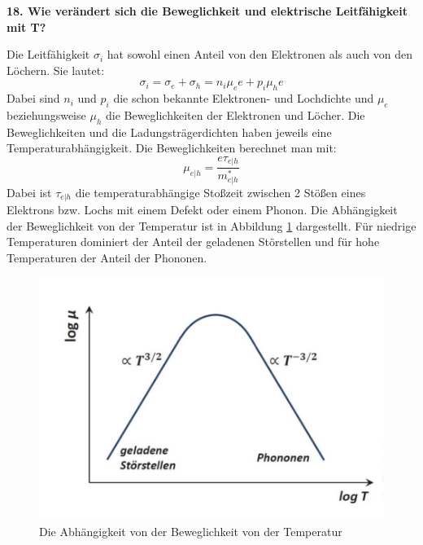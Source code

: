 \noindent\textbf{18. Wie verändert sich die Beweglichkeit und elektrische Leitfähigkeit mit T?}\\
\begin{addmargin}[25pt]{0pt}
Die Leitfähigkeit $\sigma_i$ hat sowohl einen Anteil von den Elektronen als auch von den Löchern. Sie lautet:
\begin{equation}\label{eq:leitfähigkeit}
    \sigma_i = \sigma_e + \sigma_h = n_i\mu_e e + p_i\mu_h e
\end{equation}
Dabei sind $n_i$ und $p_i$ die schon bekannte Elektronen- und Lochdichte und $\mu_e$ beziehungsweise $\mu_h$ die Beweglichkeiten der Elektronen und Löcher. Die Beweglichkeiten und die Ladungsträgerdichten haben jeweils eine Temperaturabhängigkeit. Die Beweglichkeiten berechnet man mit:
\begin{equation}\label{eq:beweglichkeit_definition}
    \mu_{e|h} = \frac{e\tau_{e|h}}{m^*_{e|h}}
\end{equation}
Dabei ist $\tau_{e|h}$ die temperaturabhängige Stoßzeit zwischen 2 Stößen eines Elektrons bzw. Lochs mit einem Defekt oder einem Phonon. Die Abhängigkeit der Beweglichkeit von der Temperatur ist in Abbildung \ref{fig:Beweglichkeit_Temperatur} dargestellt. Für niedrige Temperaturen dominiert der Anteil der geladenen Störstellen und für hohe Temperaturen der Anteil der Phononen. \\

\begin{figure}[h]
    \centering
    \includegraphics[width = \textwidth]{images/KM2/Beweglichkeit_Temperatur.jpeg}
    \caption{Die Abhängigkeit von der Beweglichkeit von der Temperatur}
    \label{fig:Beweglichkeit_Temperatur}
\end{figure}
\end{addmargin}

